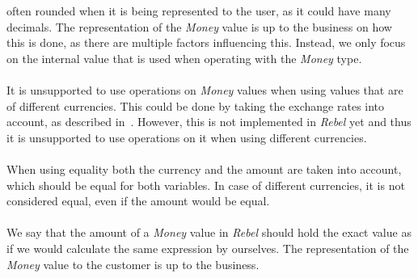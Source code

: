 often rounded when it is being represented to the user, as it could have many
decimals. The representation of the \textit{Money} value is up to the business
on how this is done, as there are multiple factors influencing this. Instead, we
only focus on the internal value that is used when operating with the
\textit{Money} type.\\
\\
It is unsupported to use operations on \textit{Money} values when using values
that are of different currencies. This could be done by taking the exchange
rates into account, as described in~\cite{fowler2002patterns}. However, this is
not implemented in \textit{Rebel} yet and thus it is unsupported to use
operations on it when using different currencies.\\
\\
When using equality both the currency and the amount are taken into account,
which should be equal for both variables. In case of different currencies, it is
not considered equal, even if the amount would be equal.\\
\\
We say that the amount of a \textit{Money} value in \textit{Rebel} should hold
the exact value as if we would calculate the same expression by ourselves. The
representation of the \textit{Money} value to the customer is up to the
business.

